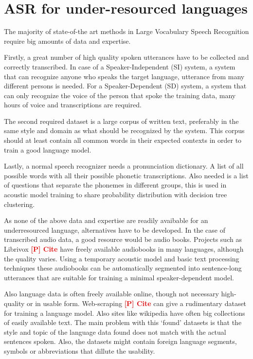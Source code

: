 \documentclass[b5paper]{article}
\newcommand{\todo}[2]{{\textcolor{red}{\bf [#1] #2 }}}
\begin{document}
\section{ASR for under-resourced languages}
The majority of state-of-the art methods in Large Vocabulary Speech Recognition require big amounts of data and expertise. 

Firstly, a great number of high quality spoken utterances have to be collected and correctly transcribed. In case of a Speaker-Independent (SI) system, a system that can recognize anyone who speaks the target language, utterance from many different persons is needed. For a Speaker-Dependent (SD) system, a system that can only recognize the voice of the person that spoke the training data, many hours of voice and transcriptions are required.

The second required dataset is a large corpus of written text, preferably in the same style and domain as what should be recognized by the system. This corpus should at least contain all common words in their expected contexts in order to train a good language model.

Lastly, a normal speech recognizer needs a pronunciation dictionary. A list of all possible words with all their possible phonetic transcriptions. Also needed is a list of questions that separate the phonemes in different groups, this is used in acoustic model training to share probability distribution with decision tree clustering.

As none of the above data and expertise are readily avaibable for an underresourced language, alternatives have to be developed. In the case of transcribed audio data, a good resource would be audio books. Projects such as Librivox \todo{P}{Cite} have freely available audiobooks in many languages, although the quality varies. Using a temporary acoustic model and basic text processing techniques these audiobooks can be automatically segmented into sentence-long utterances that are suitable for training a minimal speaker-dependent model.

Also language data is often freely available online, though not necessary high-quality or in usable form. Web-scraping  \todo{P}{Cite}  can give a rudimentary dataset for training a language model. Also sites like wikipedia have often big collections of easily available text. The main problem with this `found' datasets is that the style and topic of the language data found does not match with the actual sentences spoken. Also, the datasets might contain foreign language segments, symbols or abbreviations that dillute the usability.
\end{document}
